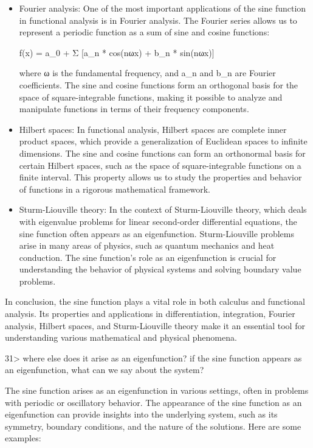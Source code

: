 \documentclass[
]{article}
\begin{document}
\begin{itemize}
\item
  Fourier analysis: One of the most important applications of the sine
  function in functional analysis is in Fourier analysis. The Fourier
  series allows us to represent a periodic function as a sum of sine and
  cosine functions:

  f(x) = a\_0 + Σ {[}a\_n * cos(nωx) + b\_n * sin(nωx){]}

  where ω is the fundamental frequency, and a\_n and b\_n are Fourier
  coefficients. The sine and cosine functions form an orthogonal basis
  for the space of square-integrable functions, making it possible to
  analyze and manipulate functions in terms of their frequency
  components.
\item
  Hilbert spaces: In functional analysis, Hilbert spaces are complete
  inner product spaces, which provide a generalization of Euclidean
  spaces to infinite dimensions. The sine and cosine functions can form
  an orthonormal basis for certain Hilbert spaces, such as the space of
  square-integrable functions on a finite interval. This property allows
  us to study the properties and behavior of functions in a rigorous
  mathematical framework.
\item
  Sturm-Liouville theory: In the context of Sturm-Liouville theory,
  which deals with eigenvalue problems for linear second-order
  differential equations, the sine function often appears as an
  eigenfunction. Sturm-Liouville problems arise in many areas of
  physics, such as quantum mechanics and heat conduction. The sine
  function's role as an eigenfunction is crucial for understanding the
  behavior of physical systems and solving boundary value problems.
\end{itemize}

In conclusion, the sine function plays a vital role in both calculus and
functional analysis. Its properties and applications in differentiation,
integration, Fourier analysis, Hilbert spaces, and Sturm-Liouville
theory make it an essential tool for understanding various mathematical
and physical phenomena.

31\textgreater{} where else does it arise as an eigenfunction? if the
sine function appears as an eigenfunction, what can we say about the
system?

The sine function arises as an eigenfunction in various settings, often
in problems with periodic or oscillatory behavior. The appearance of the
sine function as an eigenfunction can provide insights into the
underlying system, such as its symmetry, boundary conditions, and the
nature of the solutions. Here are some examples:
\end{document}
